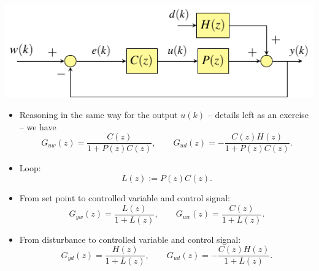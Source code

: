 \begin{frame}
\myPause
 \begin{center}
  \includegraphics[width=0.40\columnwidth]{./Unit-04/img/ControlLoop.pdf}
 \end{center}\myPause
 \begin{itemize}[<+-| alert@+>]
 \item Reasoning in the same way for the output $u(k)$ -- details left as an exercise -- we have
       \begin{displaymath}
        G_{uw}(z) =  \frac{C(z)}{1+P(z)C(z)}, \qquad
        G_{ud}(z) = -\frac{C(z)H(z)}{1+P(z)C(z)}.
       \end{displaymath}
 \end{itemize}
\end{frame}

\begin{frame}
\myPause
 \begin{itemize}[<+-| alert@+>]
 \item Loop:
       \begin{displaymath}
        L(z) := P(z)C(z).
       \end{displaymath}
 \item From set point to controlled variable and control signal:
       \begin{displaymath}
        G_{yw}(z) = \frac{L(z)}{1+L(z)}, \qquad
        G_{uw}(z) = \frac{C(z)}{1+L(z)}.
       \end{displaymath}
 \item From disturbance to controlled variable and control signal:
       \begin{displaymath}
        G_{yd}(z) =  \frac{H(z)}{1+L(z)}, \qquad
        G_{ud}(z) = -\frac{C(z)H(z)}{1+L(z)}.
       \end{displaymath}
 \end{itemize}
\end{frame}

